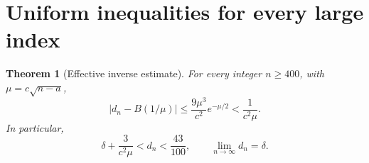 \documentclass[11pt]{article}
\numberwithin{equation}{section}
\newtheorem{theorem}{Theorem}[section]
\theoremstyle{definition}
\theoremstyle{remark}
\begin{document}
\section{Uniform inequalities for every large index}\label{sec:effective}
\begin{theorem}[Effective inverse estimate]\label{thm:effective}
For every integer $n\ge400$, with $\mu=c\sqrt{n-a}$,
\begin{equation}\label{eq:inverseerror}
 |d_n-B(1/\mu)|\le
 \frac{9\mu^3}{c^2}e^{-\mu/2}<\frac1{c^2\mu}.
\end{equation}
In particular,
\begin{equation}\label{eq:largebracket}
 \delta+\frac3{c^2\mu}<d_n<\frac{43}{100},
 \qquad \lim_{n\to\infty}d_n=\delta.
\end{equation}
\end{theorem}
\end{document}
